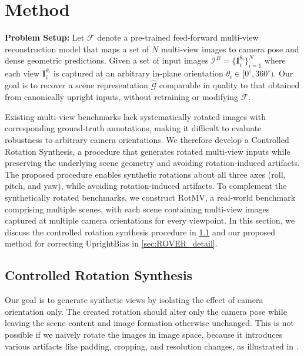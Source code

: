 \vspace{-2mm}
\section{Method}
\label{sec:method}

\textbf{Problem Setup:}
Let $\mathcal{F}$ denote a pre-trained feed-forward multi-view reconstruction model that maps a set of $N$ multi-view images to camera pose and dense geometric predictions. Given a set of input images $\mathcal{I}^R =\{ \mathbf{I}^{\theta_i}_i \}_{i=1}^N$ where each view $\mathbf{I}_i^{\theta_i}$ is captured at an arbitrary in-plane orientation $\theta_i \in [0^\circ, 360^\circ)$. 
Our goal is to recover a scene representation $\hat{\mathcal{G}}$ comparable in quality to that obtained from canonically upright inputs, without retraining or modifying $\mathcal{F}$.

Existing multi-view benchmarks lack systematically rotated images with corresponding ground-truth annotations, making it difficult to evaluate robustness to arbitrary camera orientations.
We therefore develop a Controlled Rotation Synthesis, a procedure that generates rotated multi-view inputs while preserving the underlying scene geometry and avoiding rotation-induced artifacts.
The proposed procedure enables synthetic rotations about all three axes (roll, pitch, and yaw), while avoiding rotation-induced artifacts.
To complement the synthetically rotated benchmarks, we construct RotMV, a real-world benchmark comprising multiple scenes, with each scene containing multi-view images captured at multiple camera orientations for every viewpoint.
In this section, we discuss the controlled rotation synthesis procedure in \cref{sec:rendering_based_rotation} and our proposed method for correcting UprightBias in \cref{sec:ROVER_detail}.

\subsection{Controlled Rotation Synthesis}
\label{sec:rendering_based_rotation}

Our goal is to generate synthetic views by isolating the effect of camera orientation only. 
The created rotation should alter only the camera pose while leaving the scene content and image formation otherwise unchanged.
This is not possible if we naively rotate the images in image space, because it introduces various artifacts like padding, cropping, and resolution changes, as illustrated in .


